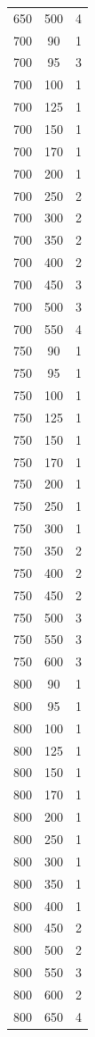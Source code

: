 \begin{longtable}{c c c}
650 & 500 & 4 \\
700 & 90 & 1 \\
700 & 95 & 3 \\
700 & 100 & 1 \\
700 & 125 & 1 \\
700 & 150 & 1 \\
700 & 170 & 1 \\
700 & 200 & 1 \\
700 & 250 & 2 \\
700 & 300 & 2 \\
700 & 350 & 2 \\
700 & 400 & 2 \\
700 & 450 & 3 \\
700 & 500 & 3 \\
700 & 550 & 4 \\
750 & 90 & 1 \\
750 & 95 & 1 \\
750 & 100 & 1 \\
750 & 125 & 1 \\
750 & 150 & 1 \\
750 & 170 & 1 \\
750 & 200 & 1 \\
750 & 250 & 1 \\
750 & 300 & 1 \\
750 & 350 & 2 \\
750 & 400 & 2 \\
750 & 450 & 2 \\
750 & 500 & 3 \\
750 & 550 & 3 \\
750 & 600 & 3 \\
800 & 90 & 1 \\
800 & 95 & 1 \\
800 & 100 & 1 \\
800 & 125 & 1 \\
800 & 150 & 1 \\
800 & 170 & 1 \\
800 & 200 & 1 \\
800 & 250 & 1 \\
800 & 300 & 1 \\
800 & 350 & 1 \\
800 & 400 & 1 \\
800 & 450 & 2 \\
800 & 500 & 2 \\
800 & 550 & 3 \\
800 & 600 & 2 \\
800 & 650 & 4 \\

\end{longtable}
